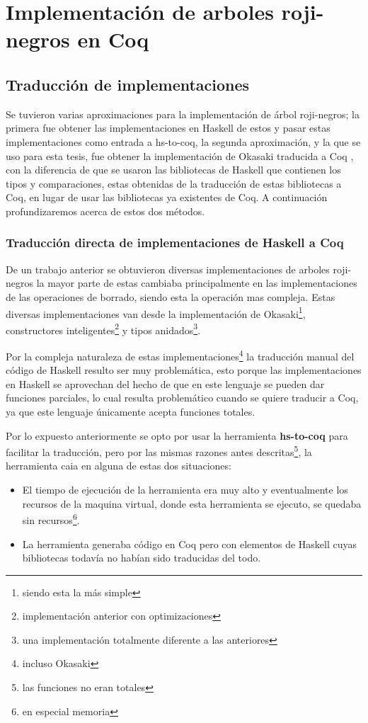 \documentclass[letterpaper,12pt,oneside]{book}
\newcommand{\coq}{\textbf{Coq}}
\newcommand{\arn}{árbol roji-negro}
\newcommand{\arns}{arboles roji-negros}
\theoremstyle{plain}
\theoremstyle{definition}
\theoremstyle{remark}
\begin{document}
\chapter{Implementación de arboles roji-negros en {\coq}}
\section{Traducción de implementaciones}
Se tuvieron varias aproximaciones para la implementación de {{{{\arn}}}s}; la primera fue obtener las 
implementaciones en Haskell de estos\cite{tesisG} y pasar estas implementaciones como entrada a 
hs-to-coq, la segunda aproximación, y la que se uso para esta tesis, fue obtener la implementación de 
Okasaki traducida a Coq  \cite{MSetRBT}, con la diferencia de que se usaron las bibliotecas de Haskell 
que contienen los tipos y comparaciones, estas obtenidas de la traducción de estas bibliotecas a Coq, en 
lugar de usar las bibliotecas ya existentes de Coq.
A continuación profundizaremos acerca de estos dos métodos.
\subsection{Traducción directa de implementaciones de Haskell a Coq}
De un trabajo anterior\cite{tesisG} se obtuvieron diversas implementaciones de {\arns} la mayor parte de 
estas cambiaba principalmente en las implementaciones de las operaciones de borrado, siendo esta la 
operación mas compleja. 
Estas diversas implementaciones van desde la implementación de Okasaki\footnote{siendo esta la m\'as 
simple}, constructores inteligentes\footnote{implementaci\'on anterior con optimizaciones} y tipos 
anidados\footnote{una implementaci\'on totalmente diferente a las anteriores}.

Por la compleja naturaleza de estas implementaciones\footnote{incluso Okasaki} la traducción manual del 
código de Haskell resulto ser muy problemática,
esto porque las implementaciones en Haskell se aprovechan del hecho de que en este lenguaje se pueden dar
funciones parciales, lo cual resulta problemático cuando se quiere traducir a Coq, ya que este lenguaje 
únicamente acepta funciones totales.

Por lo expuesto anteriormente se opto por usar la herramienta \textbf{hs-to-coq} para facilitar la 
traducci\'on, pero por las mismas razones antes descritas\footnote{las funciones no eran totales},
la herramienta caia en alguna de estas dos situaciones:

\begin{itemize}
    \item El tiempo de ejecuci\'on de la herramienta era muy alto y eventualmente los recursos de la 
    maquina virtual, donde esta herramienta se ejecuto, se quedaba sin recursos\footnote{en especial 
    memoria}.
    \item La herramienta generaba c\'odigo en Coq pero con elementos de Haskell cuyas bibliotecas todavía
    no habían sido traducidas del todo.
\end{itemize}{}
\end{document}
